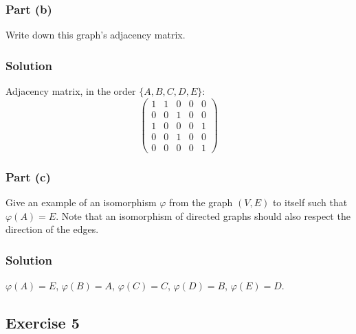 \documentclass[12pt]{article}
\begin{document}

\subsubsection*{Part (b)}

Write down this graph's adjacency matrix.

\subsubsection*{Solution}

Adjacency matrix, in the order $\{ A, B, C, D, E \}$:
\[
\begin{pmatrix}
	1 & 1 & 0 & 0 & 0 \\
	0 & 0 & 1 & 0 & 0 \\
	1 & 0 & 0 & 0 & 1 \\
	0 & 0 & 1 & 0 & 0 \\
	0 & 0 & 0 & 0 & 1
\end{pmatrix}
\]

\subsubsection*{Part (c)}

Give an example of an isomorphism $\varphi$ from the graph $(V,E)$ to itself such that $\varphi(A) = E$.
Note that an isomorphism of directed graphs should also respect the direction of the edges.

\subsubsection*{Solution}

$\varphi(A) = E$, $\varphi(B) = A$, $\varphi(C) = C$, $\varphi(D) = B$, $\varphi(E) = D$.

\pagebreak
\subsection*{Exercise 5}
\end{document}
